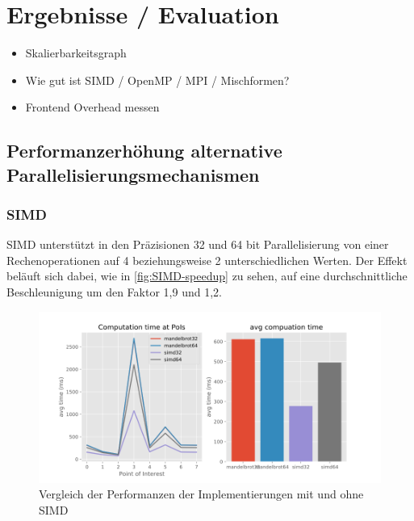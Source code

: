 \section{Ergebnisse / Evaluation}
\begin{itemize}
	\item Skalierbarkeitsgraph
	\item Wie gut ist SIMD / OpenMP / MPI / Mischformen?
	\item Frontend Overhead messen
\end{itemize}



\subsection{Performanzerhöhung alternative Parallelisierungsmechanismen}

\subsubsection{SIMD}


SIMD unterstützt in den Präzisionen 32 und 64 bit Parallelisierung von einer Rechenoperationen auf
4 beziehungsweise 2 unterschiedlichen Werten. Der Effekt beläuft sich dabei, wie in \autoref{fig:SIMD-speedup} zu sehen,
auf eine durchschnittliche Beschleunigung um den Faktor 1,9 und 1,2.

\begin{figure}
	\centering
	\includegraphics[width=0.9\linewidth]{img/Evaluation/impl_test}
	\caption{Vergleich der Performanzen der Implementierungen mit und ohne SIMD}
	\label{fig:SIMD-speedup}
\end{figure}

